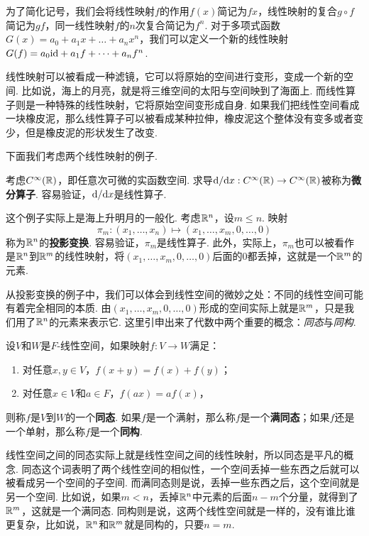 为了简化记号，我们会将线性映射$f$的作用$f(x)$简记为$fx$，线性映射的复合$g\circ f$简记为$gf$，同一线性映射$f$的$n$次复合简记为$f^n$. 对于多项式函数$G(x)=a_0+a_1x+\dots+a_nx^n$，我们可以定义一个新的线性映射$G(f)=a_0\mathrm{id}+a_1f+\dots+a_nf^n$. 

线性映射可以被看成一种滤镜，它可以将原始的空间进行变形，变成一个新的空间. 比如说，海上的月亮，就是将三维空间的太阳与空间映到了海面上. 而线性算子则是一种特殊的线性映射，它将原始空间变形成自身. 如果我们把线性空间看成一块橡皮泥，那么线性算子可以被看成某种拉伸，橡皮泥这个整体没有变多或者变少，但是橡皮泥的形状发生了改变. 

下面我们考虑两个线性映射的例子. 

\begin{example}[微分算子]
考虑$C^\infty(\mathbb{R})$，即任意次可微的实函数空间. 求导$\mathrm{d}/\mathrm{d} x:C^\infty(\mathbb{R})\to C^\infty(\mathbb{R})$被称为\textbf{微分算子}. 容易验证，$\mathrm{d}/\mathrm{d} x$是线性算子. 
\end{example}

\begin{example}[投影变换]
这个例子实际上是海上升明月的一般化. 考虑$\mathbb{R}^n$，设$m\leq n$. 映射
\[\pi_m:(x_1,\dots,x_n)\mapsto (x_1,\dots,x_m,0,\dots,0)\]
称为$\mathbb{R}^n$的\textbf{投影变换}. 容易验证，$\pi_m$是线性算子. 此外，实际上，$\pi_m$也可以被看作是$\mathbb{R}^n$到$\mathbb{R}^m$的线性映射，将$(x_1,\dots,x_m,0,\dots,0)$后面的$0$都丢掉，这就是一个$\mathbb{R}^m$的元素. 
\end{example}

从投影变换的例子中，我们可以体会到线性空间的微妙之处：不同的线性空间可能有着完全相同的本质. 由$(x_1,\dots,x_m,0,\dots,0)$形成的空间实际上就是$\mathbb{R}^m$，只是我们用了$\mathbb{R}^n$的元素来表示它. 这里引申出来了代数中两个重要的概念：\textit{同态}与\textit{同构}. 

\begin{definition}[同态与同构]
设$V$和$W$是$F$-线性空间，如果映射$f:V\to W$满足：
\begin{enumerate}
    \item 对任意$x,y\in V$，$f(x+y)=f(x)+f(y)$；
    \item 对任意$x\in V$和$a\in F$，$f(ax)=af(x)$，
\end{enumerate}
则称$f$是$V$到$W$的一个\textbf{同态}. 如果$f$是一个满射，那么称$f$是一个\textbf{满同态}；如果$f$还是一个单射，那么称$f$是一个\textbf{同构}. 
\end{definition}

线性空间之间的同态实际上就是线性空间之间的线性映射，所以同态是平凡的概念. 同态这个词表明了两个线性空间的相似性，一个空间丢掉一些东西之后就可以被看成另一个空间的子空间. 而满同态则是说，丢掉一些东西之后，这个空间就是另一个空间. 比如说，如果$m<n$，丢掉$\mathbb{R}^n$中元素的后面$n-m$个分量，就得到了$\mathbb{R}^m$，这就是一个满同态. 同构则是说，这两个线性空间就是一样的，没有谁比谁更复杂，比如说，$\mathbb{R}^n$和$\mathbb{R}^m$就是同构的，只要$n=m$. 

